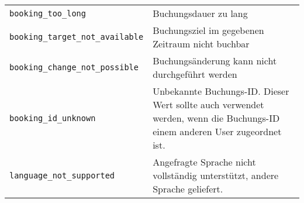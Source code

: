 \begin{flushleft}
\begin{tabularx}{\linewidth}{l>{\raggedright\arraybackslash}X}
\verb|booking_too_long| & Buchungsdauer zu lang\\
\verb|booking_target_not_available| & Buchungsziel im gegebenen Zeitraum nicht buchbar\\
\verb|booking_change_not_possible| & Buchungsänderung kann nicht durchgeführt werden\\
\verb|booking_id_unknown| & Unbekannte Buchungs-ID. Dieser Wert sollte auch verwendet werden, wenn die Buchungs-ID einem anderen User zugeordnet ist.\\
\verb|language_not_supported| & Angefragte Sprache nicht vollständig unterstützt, andere Sprache geliefert.\\
\bottomrule
\end{tabularx}
\end{flushleft}